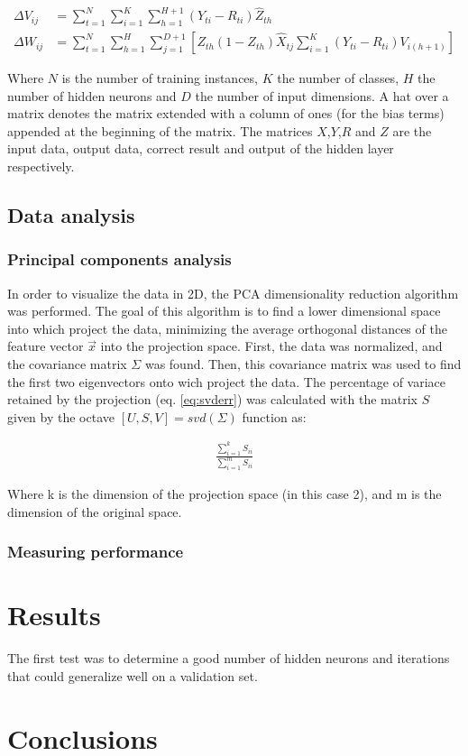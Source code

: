 \documentclass{article}
\begin{document}
\begin{align}
\Delta V_{ij} &= \sum_{t=1}^{N}{ \sum_{i=1}^{K}{ \sum_{h=1}^{H+1}{(Y_{ti} - R_{ti}) \hat{Z}_{th}} } } \label{eq:gradV} \\ 
\Delta W_{ij} &= \sum_{t=1}^{N}{ \sum_{h=1}^{H}{ \sum_{j=1}^{D+1}{
    \left[ Z_{th}(1 - Z_{th})\hat{X}_{tj} \sum_{i=1}^{K}{ (Y_{ti} - R_{ti})V_{i(h+1)} } \right]
} } } \label{eq:gradW}
\end{align}

Where $N$ is the number of training instances, $K$ the number of classes, $H$ the number of hidden neurons 
and $D$ the number of input dimensions. A hat over a matrix denotes the matrix extended with a column of
ones (for the bias terms) appended at the beginning of the matrix. The matrices $X$,$Y$,$R$ and $Z$ are
the input data, output data, correct result and output of the hidden layer respectively.

\subsection{Data analysis}

\subsubsection{Principal components analysis}
In order to visualize the data in 2D, the PCA dimensionality reduction algorithm was performed.
The goal of this algorithm is to find a lower dimensional space into which project the data, minimizing
the average orthogonal distances of the feature vector $\vec{x}$ into the projection space. First, the data
was normalized, and the covariance matrix $\Sigma$ was found. Then, this covariance matrix was used to find the
first two eigenvectors onto wich project the data. The percentage of variace retained by the projection 
(eq. \ref{eq:svderr}) was calculated with the matrix $S$ given by the octave $[U,S,V] = svd(\Sigma)$ function as:

\begin{align}
\frac{\sum_{i=1}^{k}S_{ii}}{\sum_{i=1}^{m}S_{ii}} \label{eq:svderr}
\end{align}

Where k is the dimension of the projection space (in this case 2), and m is the dimension of the original space.

\subsubsection{Measuring performance}

\section{Results}

The first test was to determine a good number of hidden neurons and iterations that could generalize well
on a validation set.




\section{Conclusions}
\end{document}
